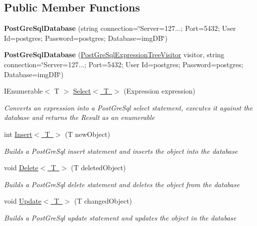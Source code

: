 \subsection*{Public Member Functions}
\begin{DoxyCompactItemize}
\item 
\mbox{\label{class_linq_1_1_post_gre_sql_database_ad038ef5510672f2e719e5d634ee48abd}} 
{\bfseries Post\+Gre\+Sql\+Database} (string connection=\char`\"{}Server=127...; Port=5432; User Id=postgres; Password=postgres; Database=img\+DB\char`\"{})
\item 
\mbox{\label{class_linq_1_1_post_gre_sql_database_a575c670d7f67ec03a9336ed3cc64cbad}} 
{\bfseries Post\+Gre\+Sql\+Database} (\mbox{\hyperlink{class_linq_1_1_post_gre_sql_expression_tree_visitor}{Post\+Gre\+Sql\+Expression\+Tree\+Visitor}} visitor, string connection=\char`\"{}Server=127...; Port=5432; User Id=postgres; Password=postgres; Database=img\+DB\char`\"{})
\item 
I\+Enumerable$<$ T $>$ \mbox{\hyperlink{class_linq_1_1_post_gre_sql_database_abffcc78b1162e9b4b8bce35118edafca}{Select$<$ T $>$}} (Expression expression)
\begin{DoxyCompactList}\small\item\em Converts an expression into a Post\+Gre\+Sql select statement, executes it against the database and returns the Result as an enumerable \end{DoxyCompactList}\item 
int \mbox{\hyperlink{class_linq_1_1_post_gre_sql_database_ab1e6bff4c4de2da6b6173c95761929c7}{Insert$<$ T $>$}} (T new\+Object)
\begin{DoxyCompactList}\small\item\em Builds a Post\+Gre\+Sql insert statement and inserts the object into the database \end{DoxyCompactList}\item 
void \mbox{\hyperlink{class_linq_1_1_post_gre_sql_database_a61c3b22701f6aff3ca6862c2999393cb}{Delete$<$ T $>$}} (T deleted\+Object)
\begin{DoxyCompactList}\small\item\em Builds a Post\+Gre\+Sql delete statement and deletes the object from the database \end{DoxyCompactList}\item 
void \mbox{\hyperlink{class_linq_1_1_post_gre_sql_database_a8060f095f8b53fb22409a794bb41279d}{Update$<$ T $>$}} (T changed\+Object)
\begin{DoxyCompactList}\small\item\em Builds a Post\+Gre\+Sql update statement and updates the object in the database \end{DoxyCompactList}\end{DoxyCompactItemize}


